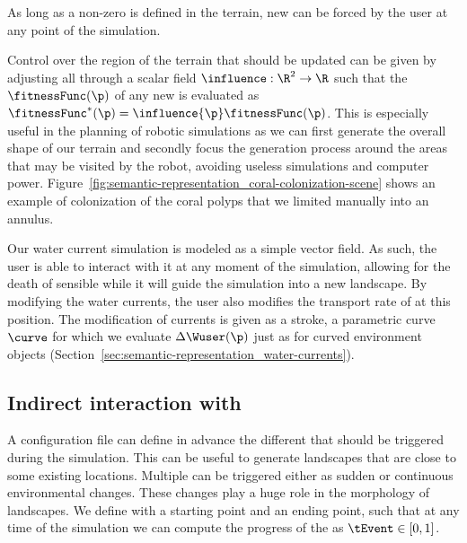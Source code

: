 As long as a non-zero  is defined in the terrain, new  can be forced by the user at any point of the simulation. 

Control over the region of the terrain that should be updated can be given by adjusting all  through a scalar field $\influence: \R^2 \to \R $ such that the  $\fitnessFunc(\p)$ of any new  is evaluated as $\fitnessFunc^*(\p) = \influence{\p} \fitnessFunc(\p)$. This is especially useful in the planning of robotic simulations as we can first generate the overall shape of our terrain and secondly focus the generation process around the areas that may be visited by the robot, avoiding useless simulations and computer power. 
Figure~\ref{fig:semantic-representation_coral-colonization-scene} shows an example of colonization of the coral polyps that we limited manually into an annulus.



Our water current simulation is modeled as a simple vector field. As such, the user is able to interact with it at any moment of the simulation, allowing for the death of sensible  while it will guide the simulation into a new landscape. By modifying the water currents, the user also modifies the transport rate of  at this position. The modification of currents is given as a stroke, a parametric curve $\curve$ for which we evaluate $\Delta \Wuser(\p)$ just as for curved environment objects (Section~\ref{sec:semantic-representation_water-currents}).

\subsection{Indirect interaction with }
\label{sec:semantic-representation_events}
A configuration file can define in advance the different  that should be triggered during the simulation. This can be useful to generate landscapes that are close to some existing locations. 
Multiple  can be triggered either as sudden or continuous environmental changes. These changes play a huge role in the morphology of landscapes.
We define  with a starting point and an ending point, such that at any time of the simulation we can compute the progress of the  as $\tEvent \in [0, 1]$.

